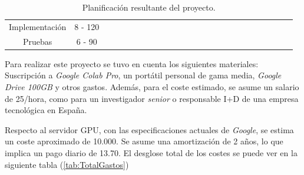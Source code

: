 \begin{table}[H]
{\begin{tabular}{|c|c|ll|llll|llll|lllll|llll|llll|}
Implementación & 8 - 120 &  &  &  &  &  &  &  &  &  \cellcolor[HTML]{9B9B9B} & \cellcolor[HTML]{9B9B9B} & \cellcolor[HTML]{9B9B9B} & \cellcolor[HTML]{9B9B9B} & &  & \cellcolor[HTML]{9B9B9B}  & \cellcolor[HTML]{9B9B9B}  & & & \cellcolor[HTML]{9B9B9B} & \cellcolor[HTML]{9B9B9B} &  &  &  \\ \cline{1-1}
Pruebas & 6 - 90 &  &  &  &  &  &  &  &  &  &  &  &  & \cellcolor[HTML]{9B9B9B}   & \cellcolor[HTML]{9B9B9B} & & & \cellcolor[HTML]{9B9B9B} & \cellcolor[HTML]{9B9B9B} &  &  & \cellcolor[HTML]{9B9B9B} & \cellcolor[HTML]{9B9B9B} & \\ \hline
\end{tabular}%
}
\caption{Planificación resultante del proyecto.}
\label{tab:PlanificacionFinal}
\end{table}

Para realizar este proyecto se tuvo en cuenta los siguientes materiales:
Suscripción a \emph{Google Colab Pro}, un portátil personal de gama media, 
\emph{Google Drive 100GB} y otros gastos. 
Además, para el coste estimado, se asume un salario de 25\officialeuro/hora, como para un investigador \emph{senior} o
responsable I+D de una empresa tecnológica en España. 
 
Respecto al servidor GPU, con las especificaciones actuales de \emph{Google}, 
se estima un coste aproximado de 10.000\officialeuro. Se asume una amortización de 2 años, 
lo que implica un pago diario de 13.70\officialeuro. El desglose total de los costes 
se puede ver en la siguiente tabla (\ref{tab:TotalGastos})

